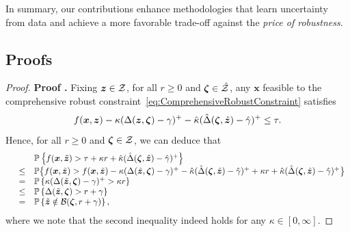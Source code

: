 \documentclass[mnsc, nonblindrev]{informswp}
\newcommand{\1}[1]{\mathds{1}{\left(#1\right)}}
\begin{document}
In summary, our contributions enhance methodologies that learn uncertainty from data and achieve a more favorable trade-off against the \emph{price of robustness}.





\newpage
\begin{appendices}

\section{Proofs}

\begin{proof}{\bf Proof .}
Fixing $\bm z \in \mathcal{Z}$, for all $r \geq 0$ and $\bm \zeta  \in \hat {\mathcal{Z}}$, any $\bm x$ feasible to the comprehensive robust constraint~\eqref{eq:ComprehensiveRobustConstraint} satisfies
\[
f(\bm x,\bm z) - \kappa (\Delta(\bm z,\bm \zeta) - \gamma)^+ - \hat \kappa (\hat \Delta(\bm \zeta,\hat{\bm{z}}) - \hat \gamma)^+ \leq \tau.
\]
Hence, for all $r \geq 0$ and $\bm \zeta  \in \mathcal{Z}$, we can deduce that
$$
\begin{array}{rcl}
&& \mathbb{P}\left\{f(\bm{x},\tilde{\bm{z}}) > \tau + \kappa r + \hat \kappa (\hat \Delta(\bm \zeta,\hat{\bm{z}}) - \hat \gamma)^+\right\}\\
&\leq&  \mathbb{P}\big\{f(\bm{x},\tilde{\bm{z}}) >  f(\bm{x}, \tilde{\bm{z}}) - \kappa( \Delta(\tilde{\bm{z}},\bm \zeta) - \gamma)^+ - \hat\kappa(\hat \Delta(\bm \zeta,\hat{\bm{z}}) - \hat \gamma)^+  + \kappa r + \hat \kappa (\hat \Delta(\bm \zeta,\hat{\bm{z}}) - \hat \gamma)^+\big\}\\
& =& \mathbb{P}\left\{\kappa( \Delta(\tilde{\bm{z}},\bm \zeta) - \gamma)^+ > \kappa r\right\} \\
&\leq & \mathbb{P}\left\{\Delta(\tilde{\bm{z}},\bm \zeta) > r+\gamma\right\}\\
&=& \mathbb{P}\left\{\tilde{\bm{z}} \notin \mathcal{B}(\bm \zeta,r+\gamma)\right\}, 
\end{array}
$$
where we note that the second inequality indeed holds for any $\kappa \in [0,\infty]$.
\hfill \Halmos
\end{proof}
\vspace{3mm}


\end{appendices}
\end{document}
